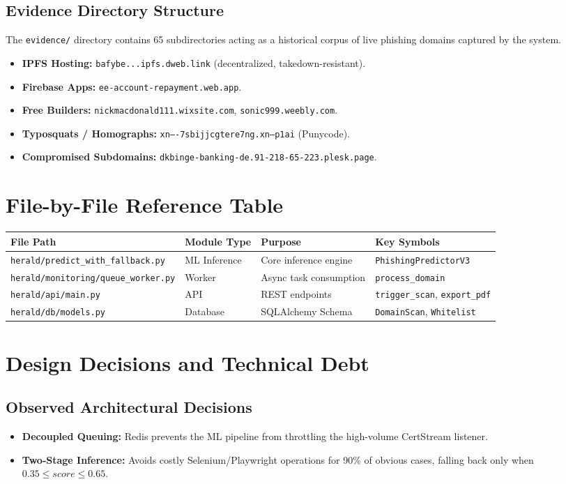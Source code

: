 \documentclass[12pt,a4paper]{report}
\begin{document}
\section{Evidence Directory Structure}
The \texttt{evidence/} directory contains 65 subdirectories acting as a historical corpus of live phishing domains captured by the system.
\begin{itemize}
\item \textbf{IPFS Hosting:} \texttt{bafybe...ipfs.dweb.link} (decentralized, takedown-resistant).
\item \textbf{Firebase Apps:} \texttt{ee-account-repayment.web.app}.
\item \textbf{Free Builders:} \texttt{nickmacdonald111.wixsite.com}, \texttt{sonic999.weebly.com}.
\item \textbf{Typosquats / Homographs:} \texttt{xn----7sbijjcgtere7ng.xn--p1ai} (Punycode).
\item \textbf{Compromised Subdomains:} \texttt{dkbinge-banking-de.91-218-65-223.plesk.page}.
\end{itemize}

\chapter{File-by-File Reference Table}
\begin{longtable}{|p{4cm}|p{2cm}|p{4cm}|p{4cm}|}
\hline
\textbf{File Path} & \textbf{Module Type} & \textbf{Purpose} & \textbf{Key Symbols} \\
\hline
\endhead
\texttt{herald/predict\_with\_fallback.py} & ML Inference & Core inference engine & \texttt{PhishingPredictorV3} \\
\texttt{herald/monitoring/queue\_worker.py} & Worker & Async task consumption & \texttt{process\_domain} \\
\texttt{herald/api/main.py} & API & REST endpoints & \texttt{trigger\_scan}, \texttt{export\_pdf} \\
\texttt{herald/db/models.py} & Database & SQLAlchemy Schema & \texttt{DomainScan}, \texttt{Whitelist} \\
\hline
\end{longtable}

\chapter{Design Decisions and Technical Debt}
\section{Observed Architectural Decisions}
\begin{itemize}
\item \textbf{Decoupled Queuing:} Redis prevents the ML pipeline from throttling the high-volume CertStream listener.
\item \textbf{Two-Stage Inference:} Avoids costly Selenium/Playwright operations for 90\% of obvious cases, falling back only when $0.35 \le score \le 0.65$.
\end{itemize}
\end{document}

